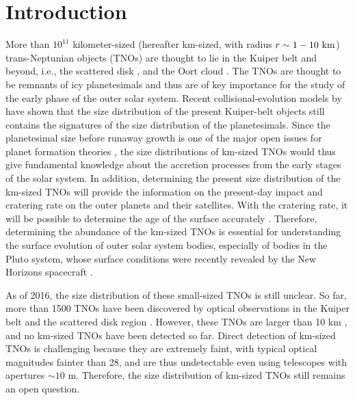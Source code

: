 \documentclass{pasj01}
\newcommand{\void}[1]{}
\renewcommand{\textcolor}{\void}
\begin{document}
\section{Introduction}
\label{intro}
More than $10^{11}$ kilometer-sized
(hereafter km-sized, with 
\textcolor{red}{radius} $\textcolor{red}{r} \sim 1-10 \ {\rm km}$) 
trans-Neptunian objects (TNOs) are thought to lie in the Kuiper belt and beyond, 
i.e., the scattered disk  \citep{duncan97, volk08}, and the Oort cloud \citep{oort50}. 
The TNOs are thought to be remnants of icy planetesimals  
and thus are of key importance for the study of the early phase of the outer solar system. 
Recent collisional-evolution models by \citet{schlichting13} have shown that the size distribution of the 
present Kuiper-belt objects still contains the signatures of the size distribution of the planetesimals. 
Since the planetesimal size before runaway growth
is one of the major open issues for planet formation theories \citep{chiang10},
the size distributions of km-sized TNOs
would thus give fundamental knowledge about
the accretion processes from the early stages of the solar system.
In addition, determining the present size distribution of the km-sized TNOs
will provide the information on the present-day impact and cratering
rate on the outer planets and their satellites. 
With the cratering rate, 
it will be possible to determine the age of the surface accurately \citep{greenstreet15}. 
Therefore, determining the abundance of the km-sized TNOs is essential 
for understanding the surface evolution of outer solar system bodies, 
especially of bodies in the Pluto system,
whose surface conditions were recently revealed by 
the New Horizons spacecraft \citep{stern15}.


As of 2016, the size distribution of these small-sized TNOs is still unclear.
So far, more than 1500 TNOs have been discovered 
by optical observations in the Kuiper belt and the scattered disk region
\citep[e.g.][]{jewitt93}.
However, these TNOs are larger than \textcolor{red}{10} km \citep[e.g.][]{fraser08}, 
and no km-sized TNOs have been detected so far. 
Direct detection of km-sized TNOs is challenging
because they are extremely faint, with typical optical magnitudes fainter than \textcolor{red}{28}, 
and are thus undetectable even using telescopes with apertures $\sim 10$ m.
Therefore, the size distribution of km-sized TNOs 
still remains an open question.
\end{document}
